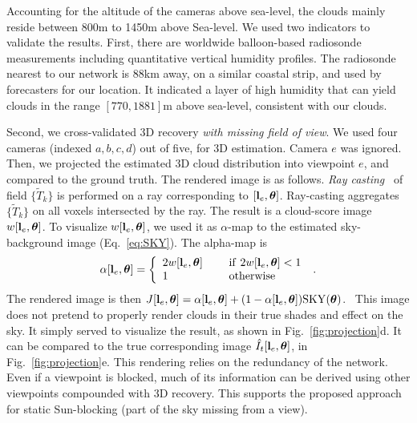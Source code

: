 \documentclass[runningheads]{llncs}
\begin{document}
Accounting for the altitude of the cameras above sea-level, the clouds mainly reside between 800m to 1450m above Sea-level. We used two indicators to validate the results. First, there are worldwide balloon-based radiosonde measurements including quantitative vertical humidity profiles. The radiosonde nearest to our network is 88km away, on a similar coastal strip, and used by forecasters for our location. It indicated a layer of high humidity that can yield clouds in the range $[770,1881]$m above sea-level, consistent with our clouds.

Second, we cross-validated 3D recovery {\em with missing field of view}. We used four cameras (indexed $a,b,c,d$) out of five, for 3D estimation. Camera $e$ was ignored. Then, we projected the estimated 3D cloud distribution into viewpoint $e$, and compared to the ground truth. The rendered image is as follows. {\em Ray casting}~\cite{Levoy1990} of  field $\{\tilde T_k\}$ is performed on a ray corresponding to
$[{\bf l}_e,{\bm \theta}]$. Ray-casting aggregates $\{\tilde T_k\}$ on all voxels intersected by the ray. The result is a cloud-score image $w[{\bf l}_e,{\bm \theta}]$.
To visualize $w[{\bf l}_e,{\bm \theta}]$, we used it as $\alpha$-map to the estimated sky-background image (Eq.~\ref{eq:SKY}). The alpha-map is
\begin{equation}
 \alpha[{\bf l}_e,{\bm \theta}]=\left\{
      \begin{array}{ll}
      2w[{\bf l}_e,{\bm \theta}]
      & ~~~~{\rm if}~ 2w[{\bf l}_e,{\bm \theta}]<1 \\
      1
      & ~~~~{\rm otherwise}
      \end{array}
      \right.
  \;.
 \label{eq:alpha}
\end{equation}
The rendered image is then
 $J[{\bf l}_e,{\bm \theta}]=
 \alpha[{\bf l}_e,{\bm \theta}]+(1-\alpha[{\bf l}_e,{\bm \theta}]){\rm SKY}({\bm \theta})$.~
This image does not pretend to properly render clouds in their true shades and effect on the sky. It simply served to visualize the result, as shown in Fig.~\ref{fig:projection}d. It can be compared to the true corresponding image $\hat I_t[{\bf l}_e,{\bm \theta}]$, in Fig.~\ref{fig:projection}e.
This rendering relies on the redundancy of the network. Even if a viewpoint is blocked, much of its information can be derived using other viewpoints compounded with 3D recovery. This supports the proposed approach for static Sun-blocking (part of the sky missing from a view).
\end{document}
